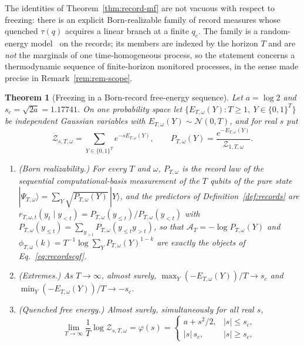 \documentclass[aps,prx,reprint,superscriptaddress,nobibnotes,longbibliography]{revtex4-2}
\newtheorem{theorem}{Theorem}
\theoremstyle{remark}
\begin{document}
The identities of Theorem~\ref{thm:record-mf} are not vacuous with respect to freezing: there is an explicit Born-realizable family of record measures whose quenched $\tau(q)$ acquires a linear branch at a finite $q_c$.  The family is a random-energy model~\cite{Derrida1981} on the records; its members are indexed by the horizon $T$ and are \emph{not} the marginals of one time-homogeneous process, so the statement concerns a thermodynamic sequence of finite-horizon monitored processes, in the sense made precise in Remark~\ref{rem:rem-scope}.

\begin{theorem}[Freezing in a Born-record free-energy sequence]
\label{thm:rem}
Let $a=\log2$ and $s_c=\sqrt{2a}=1.17741$.  On one probability space let $\{E_{T,\omega}(Y):T\ge1,\ Y\in\{0,1\}^T\}$ be independent Gaussian variables with $E_{T,\omega}(Y)\sim\mathcal N(0,T)$, and for real $s$ put
\begin{equation}
 \mathcal Z_{s,T,\omega}=\sum_{Y\in\{0,1\}^T}e^{-sE_{T,\omega}(Y)},\qquad
 P_{T,\omega}(Y)=\frac{e^{-E_{T,\omega}(Y)}}{\mathcal Z_{1,T,\omega}}.
 \label{eq:remP}
\end{equation}
\begin{enumerate}
\item[(i)] (Born realizability.)  For every $T$ and $\omega$, $P_{T,\omega}$ is the record law of the sequential computational-basis measurement of the $T$ qubits of the pure state $|\Psi_{T,\omega}\rangle=\sum_Y\sqrt{P_{T,\omega}(Y)}\,|Y\rangle$, and the predictors of Definition~\ref{def:records} are $r_{T,\omega,t}(y_t\mid y_{<t})=P_{T,\omega}(y_{\le t})/P_{T,\omega}(y_{<t})$ with $P_{T,\omega}(y_{\le t})=\sum_{y_{>t}}P_{T,\omega}(y_{\le t}y_{>t})$, so that $\mathcal A_T=-\log P_{T,\omega}(Y)$ and $\phi_{T,\omega}(k)=T^{-1}\log\sum_YP_{T,\omega}(Y)^{1-k}$ are exactly the objects of Eq.~\eqref{eq:recordscgf}.
\item[(ii)] (Extremes.)  As $T\to\infty$, almost surely, $\max_Y(-E_{T,\omega}(Y))/T\to s_c$ and $\min_Y(-E_{T,\omega}(Y))/T\to-s_c$.
\item[(iii)] (Quenched free energy.)  Almost surely, simultaneously for all real $s$,
\begin{equation}
 \lim_{T\to\infty}\frac1T\log\mathcal Z_{s,T,\omega}=\varphi(s)=
 \begin{cases}a+s^2/2,&|s|\le s_c,\\ |s|\,s_c,&|s|\ge s_c,\end{cases}
 \label{eq:remphi}
\end{equation}

\end{enumerate}
\end{theorem}
\end{document}
